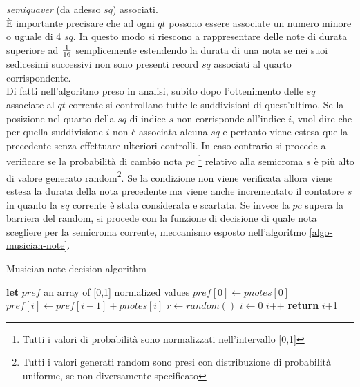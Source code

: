 \emph{semiquaver} (da adesso $sq$) associati.\\
È importante precisare che ad ogni $qt$ possono essere
associate un numero minore o uguale di 4 $sq$. In questo modo si
riescono a rappresentare delle note di durata superiore ad $1\over{16}$ 
semplicemente estendendo la durata di una nota se nei suoi sedicesimi successivi 
non sono presenti record $sq$ associati al quarto
corrispondente.\\
Di fatti nell'algoritmo preso in analisi, subito dopo l'ottenimento
delle $sq$ associate al $qt$ corrente si controllano tutte le
suddivisioni di quest'ultimo. 
Se la posizione nel quarto della $sq$ 
di indice $s$ non corrisponde all'indice $i$, vuol dire che per quella
suddivisione $i$ non è associata alcuna $sq$ e pertanto
viene estesa quella precedente senza effettuare ulteriori controlli.
In caso contrario si procede a verificare se la probabilità di cambio
nota $pc$ 
\footnote{Tutti i valori di probabilità sono normalizzati
nell'intervallo [0,1]} relativo alla semicroma $s$ è più alto di valore 
generato random\footnote{Tutti i valori generati random sono presi con
distribuzione di probabilità uniforme, se non diversamente specificato}. 
Se la condizione non viene verificata allora viene
estesa la durata della nota precedente ma viene anche incrementato il
contatore $s$ in quanto la $sq$ corrente è stata considerata e scartata.
Se invece la $pc$ supera la barriera del random, si procede con la
funzione di decisione di quale nota scegliere per la semicroma corrente,
meccanismo esposto nell'algoritmo \ref{algo-musician-note}.

\begin{algorithm}[H]
\caption{Musician note decision algorithm}
\label{algo-musician-note}
\begin{algorithmic}[1]
	\State \textbf{let} $pref$ an array of [0,1] normalized values
	\State $pref[0]\gets pnotes[0]$
	 
		\State $pref[i] \gets pref[i - 1] + pnotes[i]$
	\EndFor
	\State $r \gets random()$
	\State $i \gets 0 $
		\State $i$++	
	\EndWhile
	\State \textbf{return} $i$+1 
\EndFunction
\end{algorithmic}
\end{algorithm}

